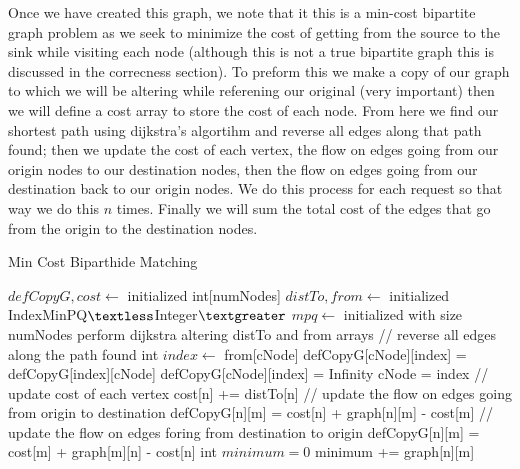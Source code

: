 \documentclass[12pt]{article}
\begin{document}
Once we have created this graph, we note that it this is a min-cost bipartite graph problem as we seek to
minimize the cost of getting from the source to the sink while visiting each node (although this is not a
true bipartite graph this is discussed in the correcness section). To preform this we make a copy of our
graph to which we will be altering while referening our original (very important) then we will define a
cost array to store the cost of each node. From here we find our shortest path using dijkstra's algortihm
and reverse all edges along that path found; then we update the cost of each vertex, the flow on edges going
from our origin nodes to our destination nodes, then the flow on edges going from our destination back to our
origin nodes. We do this process for each request so that way we do this $n$ times. Finally we will sum the
total cost of the edges that go from the origin to the destination nodes.

\begin{algorithm}[H]
\caption{Min Cost Biparthide Matching}
\begin{algorithmic}
        \State $defCopyG, cost \gets$ initialized
            \State int[numNodes] $distTo, from \gets$ initialized
            \State IndexMinPQ$\textless$Integer$\textgreater$ $mpq \gets$ initialized with size numNodes
            \State perform dijkstra altering distTo and from arrays
            \State // reverse all edges along the path found
                \State int $index \gets$ from[cNode]
                \State defCopyG[cNode][index] = defCopyG[index][cNode]
                \State defCopyG[cNode][index] = Infinity
                \State cNode = index
            \EndWhile
            \State // update cost of each vertex
                \State cost[n] += distTo[n]
            \EndFor
            \State // update the flow on edges going from origin to destination
                \State defCopyG[n][m] = cost[n] + graph[n][m] - cost[m]
            \EndFor
            \State // update the flow on edges foring from destination to origin
                \State defCopyG[n][m] = cost[m] + graph[m][n] - cost[n]
            \EndFor
        \EndFor
        \State int $minimum = 0$
                    \State minimum += graph[n][m]
                \EndIf
            \EndFor
        \EndFor
    \EndProcedure
\end{algorithmic}
\end{algorithm}
\end{document}

